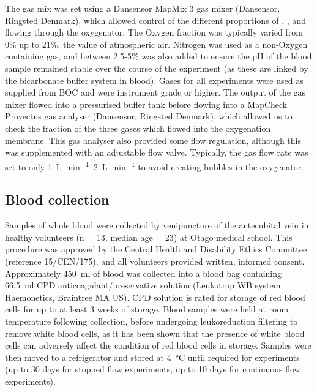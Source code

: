 The gas mix was set using a Dansensor MapMix 3 gas mixer (Dansensor, Ringsted Denmark), which allowed control of the different proportions of \Ntwo, \Otwo, and \COtwo flowing through the oxygenator.
The Oxygen fraction was typically varied from 0\% up to 21\%, the value of atmospheric air.
Nitrogen was used as a non-Oxygen containing gas, and between 2.5-5\% \COtwo was also added to ensure the pH of the blood sample remained stable over the course of the experiment (as these are linked by the bicarbonate buffer system in blood).
Gases for all experiments were used as supplied from BOC and were instrument grade or higher.
The output of the gas mixer flowed into a pressurised buffer tank before flowing into a MapCheck Provectus gas analyser (Dansensor, Ringsted Denmark), which allowed us to check the fraction of the three gases which flowed into the oxygenation membrane.
This gas analyser also provided some flow regulation, although this was supplemented with an adjustable flow valve.
Typically, the gas flow rate was set to only \SIrange[per-mode=symbol]{1}{2}{\liter\per\minute} to avoid creating bubbles in the oxygenator.

\subsection{Blood collection}
Samples of whole blood were collected by venipuncture of the antecubital vein in healthy volunteers (n = 13, median age = 23) at Otago medical school.
This procedure was approved by the Central Health and Disability Ethics Committee (reference 15/CEN/175), and all volunteers provided written, informed consent.
Approximately \SI{450}{ml} of blood was collected into a blood bag containing \SI{66.5}{\milli\litre} CPD anticoagulant/preservative solution (Leukotrap WB system, Haemonetics, Braintree MA US).
CPD solution is rated for storage of red blood cells for up to at least 3 weeks of storage\cite{Hessupdatesolutionsred2006}.
Blood samples were held at room temperature following collection, before undergoing leukoreduction filtering to remove white blood cells, as it has been shown that the presence of white blood cells can adversely affect the condition of red blood cells in storage\cite{Hessupdatesolutionsred2006}.
Samples were then moved to a refrigerator and stored at \SI{4}{\degreeCelsius} until required for experiments (up to 30 days for stopped flow experiments, up to 10 days for continuous flow experiments).

